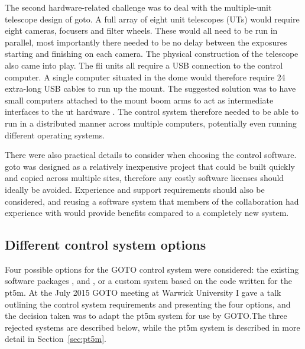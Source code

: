 \begin{colsection}
\begin{colsection}
The second hardware-related challenge was to deal with the multiple-unit telescope design of \gls{goto}. A full array of eight unit telescopes (UTs) would require eight cameras, focusers and filter wheels. These would all need to be run in parallel, most importantly there needed to be no delay between the exposures starting and finishing on each camera. The physical construction of the telescope also came into play. The \gls{fli} units all require a USB connection to the control computer. A single computer situated in the dome would therefore require 24 extra-long USB cables to run up the mount. The suggested solution was to have small computers attached to the mount boom arms to act as intermediate interfaces to the \gls{ut} hardware . The control system therefore needed to be able to run in a distributed manner across multiple computers, potentially even running different operating systems.

There were also practical details to consider when choosing the control software. \gls{goto} was designed as a relatively inexpensive project that could be built quickly and copied across multiple sites, therefore any costly software licenses should ideally be avoided. Experience and support requirements should also be considered, and reusing a software system that members of the collaboration had experience with would provide benefits compared to a completely new system.

\end{colsection}


\subsection{Different control system options}
\label{sec:control_options}
\begin{colsection}

Four possible options for the GOTO control system were considered: the existing software packages ,  and , or a custom system based on the code written for the \gls{pt5m}. At the July 2015 GOTO meeting at Warwick University I gave a talk outlining the control system requirements and presenting the four options, and the decision taken was to adapt the \gls{pt5m} system for use by GOTO.\@ The three rejected systems are described below, while the \gls{pt5m} system is described in more detail in Section~\ref{sec:pt5m}.


\end{colsection}
\end{colsection}
